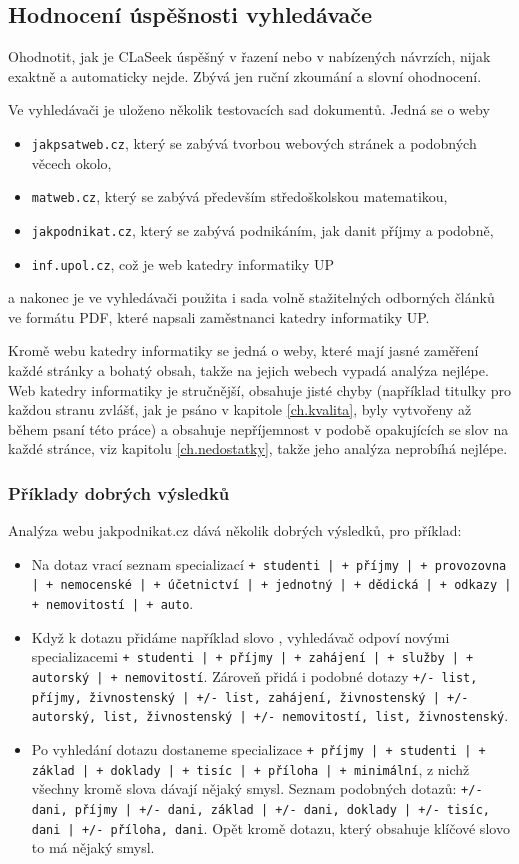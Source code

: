 \documentclass[12pt]{article}
\newcommand{\name}{CLaSeek}
\newcommand{\code}[1]{\texttt{#1}}
\newcommand{\ssection}[1]{\subsection{#1}}
\newcommand{\sssection}[1]{\subsubsection{#1}}
\begin{document}
\ssection{Hodnocení úspěšnosti vyhledávače}
Ohodnotit, jak je \name{} úspěšný v řazení nebo v nabízených návrzích, nijak exaktně a automaticky nejde. Zbývá jen ruční zkoumání a slovní ohodnocení. 

Ve vyhledávači je uloženo několik testovacích sad dokumentů. Jedná se o weby 
\begin{itemize}
	\item \code{jakpsatweb.cz}, který se zabývá tvorbou webových stránek a podobných věcech okolo, 
	\item \code{matweb.cz}, který se zabývá především středoškolskou matematikou,
	\item \code{jakpodnikat.cz}, který se zabývá podnikáním, jak danit příjmy a podobně,
	\item \code{inf.upol.cz}, což je web katedry informatiky UP
\end{itemize}
a nakonec je ve vyhledávači použita i sada volně stažitelných odborných článků ve formátu PDF, které napsali zaměstnanci katedry informatiky UP. 

Kromě webu katedry informatiky se jedná o weby, které mají jasné zaměření každé stránky a bohatý obsah, takže na jejich webech vypadá analýza nejlépe. Web katedry informatiky je stručnější, obsahuje jisté chyby (například titulky pro každou stranu zvlášť, jak je psáno v kapitole \ref{ch.kvalita}, byly vytvořeny až během psaní této práce) a obsahuje nepříjemnost v podobě opakujících se slov na každé stránce, viz kapitolu \ref{ch.nedostatky}, takže jeho analýza neprobíhá nejlépe. 

\sssection{Příklady dobrých výsledků}
Analýza webu jakpodnikat.cz dává několik dobrých výsledků, pro příklad:

\begin{itemize}
	\item Na dotaz  vrací seznam specializací \code{+ studenti | + příjmy | + provozovna | + nemocenské | + účetnictví | + jednotný | + dědická | + odkazy | + nemovitostí | + auto}.
	\item Když k dotazu přidáme například slovo , vyhledávač odpoví novými specializacemi \code{+ studenti | + příjmy | + zahájení | + služby | + autorský | + nemovitostí}. Zároveň přidá i podobné dotazy \code{+/- list, příjmy, živnostenský | +/- list, zahájení, živnostenský | +/- autorský, list, živnostenský | +/- nemovitostí, list, živnostenský}.
	\item Po vyhledání dotazu  dostaneme specializace \code{+ příjmy | + studenti | + základ | + doklady | + tisíc | + příloha | + minimální}, z nichž všechny kromě slova  dávají nějaký smysl. Seznam podobných dotazů: \code{+/- dani, příjmy | +/- dani, základ | +/- dani, doklady | +/- tisíc, dani | +/- příloha, dani}. Opět kromě dotazu, který obsahuje klíčové slovo  to má nějaký smysl. 
\end{itemize}
\end{document}

